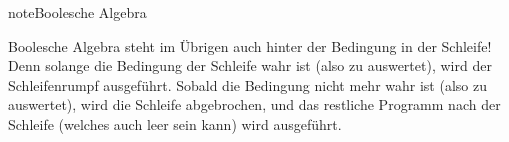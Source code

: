 \documentclass[letterpaper,10pt,english]{jupyterBook}
\begin{document}
\begin{sphinxadmonition}{note}{Boolesche Algebra}

\sphinxAtStartPar
Boolesche Algebra steht im Übrigen auch hinter der Bedingung in der \sphinxhyphen{}Schleife! Denn solange die Bedingung der Schleife wahr ist (also zu  auswertet), wird der Schleifenrumpf ausgeführt. Sobald die Bedingung nicht mehr wahr ist (also zu  auswertet), wird die Schleife abgebrochen, und das restliche Programm nach der Schleife (welches auch leer sein kann) wird ausgeführt.
\end{sphinxadmonition}







\renewcommand{\indexname}{Index}
\printindex
\end{document}
